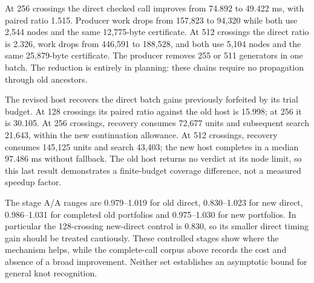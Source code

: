 

At 256 crossings the direct checked call improves from 74.892 to 49.422 ms,
with paired ratio 1.515. Producer work drops from 157,823 to 94,320 while
both use 2,544 nodes and the same 12,775-byte certificate. At 512 crossings
the direct ratio is 2.326, work drops from 446,591 to 188,528, and both use
5,104 nodes and the same 25,879-byte certificate. The producer removes
255 or 511 generators in one batch. The reduction is entirely in planning:
these chains require no propagation through old ancestors.

The revised host recovers the direct batch gains previously forfeited by
its trial budget. At 128 crossings its paired ratio against the old host
is 15.998; at 256 it is 30.105. At 256 crossings, recovery consumes 72,677
units and subsequent search 21,643, within the new continuation allowance.
At 512 crossings, recovery consumes 145,125 units and search 43,403;
the new host completes in a median 97.486 ms without fallback. The old
host returns no verdict at its node limit, so this last result demonstrates
a finite-budget coverage difference, not a measured speedup factor.

The stage A/A ranges are 0.979--1.019 for old direct, 0.830--1.023 for
new direct, 0.986--1.031 for completed old portfolios and 0.975--1.030 for
new portfolios. In particular the 128-crossing new-direct control is 0.830,
so its smaller direct timing gain should be treated cautiously. These
controlled stages show where the mechanism helps, while the complete-call
corpus above records the cost and absence of a broad improvement. Neither
set establishes an asymptotic bound for general knot recognition.
